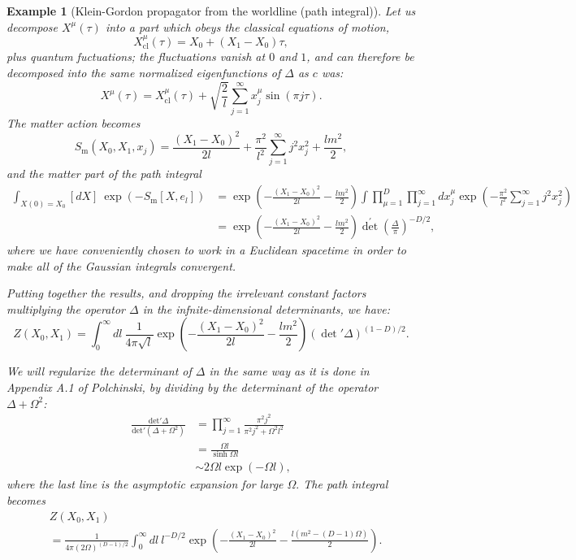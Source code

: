 \documentclass[10pt,
 article,
 amsmath,amssymb
]{revtex4-2}
\newtheorem{example}[theorem]{Example}
\begin{document}
\begin{example}[Klein-Gordon propagator from the worldline (path integral)]
Let us decompose $X^\mu(\tau)$ into a part which obeys the classical equations of motion,
$$X_{\mathrm{cl}}^\mu(\tau)=X_0+(X_1-X_0)\tau,$$
plus quantum fuctuations; the fluctuations vanish at $0$ and $1$, and can therefore be decomposed
into the same normalized eigenfunctions of $\Delta$ as $c$ was:
$$X^\mu(\tau)=X_{\text{cl}}^\mu(\tau)+\sqrt{\frac{2}{l}}\sum_{j=1}^\infty x_j^\mu\sin(\pi j\tau).$$
The matter action becomes
$$S_\text{m}(X_0,X_1,x_j)=\frac{(X_1-X_0)^2}{2l}+\frac{\pi^2}{l^2}\sum_{j=1}^\infty j^2x_j^2+\frac{lm^2}{2},$$
and the matter part of the path integral
$$\begin{aligned}\int_{X(0)=X_0}[dX]\:\exp\left(-S_\mathrm{m}[X,e_l]\right)&=\exp\left(-\frac{(X_1-X_0)^2}{2l}-\frac{lm^2}2\right)\int\prod_{\mu=1}^D\prod_{j=1}^\infty dx_j^\mu\exp\left(-\frac{\pi^2}{l^2}\sum_{j=1}^\infty j^2x_j^2\right)\\&=\exp\left(-\frac{(X_1-X_0)^2}{2l}-\frac{lm^2}2\right)\det^{\prime}\left(\frac\Delta\pi\right)^{-D/2},\end{aligned}$$
where we have conveniently chosen to work in a Euclidean spacetime in order to make all of the
Gaussian integrals convergent.

Putting together the results, and dropping the irrelevant constant factors
multiplying the operator $\Delta$ in the infnite-dimensional determinants, we have:
$$Z(X_0,X_1)=\int_0^\infty dl\:\frac{1}{4\pi\sqrt{l}}\exp\left(-\frac{(X_1-X_0)^2}{2l}-\frac{lm^2}{2}\right)\left(\det'\Delta\right)^{(1-D)/2}.$$

We will regularize the determinant of $\Delta$ in the same way as it is done in Appendix A.1 of Polchinski, by dividing
by the determinant of the operator $\Delta+\Omega^2$:
$$\begin{aligned}\frac{\mathrm{det'}\Delta}{\mathrm{det'}(\Delta+\Omega^2)}&=\prod_{j=1}^\infty\frac{\pi^2j^2}{\pi^2j^2+\Omega^2l^2}\\&=\frac{\Omega l}{\sinh\Omega l}\\&\sim2\Omega l\exp\left(-\Omega l\right),\end{aligned}$$
where the last line is the asymptotic expansion for large $\Omega.$ The path integral becomes
$$\begin{aligned}&Z(X_0,X_1)\\&=\frac1{4\pi(2\Omega)^{(D-1)/2}}\int_0^\infty dl\:l^{-D/2}\exp\left(-\frac{(X_1-X_0)^2}{2l}-\frac{l(m^2-(D-1)\Omega)}2\right).\end{aligned}$$



\end{example}
\end{document}
